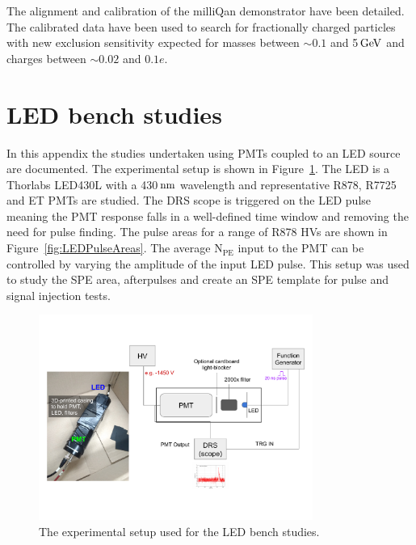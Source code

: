 \documentclass[12pt]{article}
\newcommand{\unit}[1]{\ensuremath{\text{\,#1}}\xspace}
\newcommand{\npe} {\mbox{\ensuremath{\textrm{N}_\textrm{PE}}}\xspace}
\begin{document}
The alignment and calibration of the milliQan demonstrator have been detailed. The calibrated
data have been used to search for fractionally charged particles with new 
exclusion sensitivity expected for masses between $\sim0.1$ and 5\unit{GeV} 
and charges between $\sim0.02$ and $0.1e$.

\appendix
\section{LED bench studies}
\label{app:speLEDCalib}
In this appendix the studies undertaken using PMTs coupled to an LED source are documented.
The experimental setup is shown in Figure~\ref{fig:LEDSetup}. The LED is a Thorlabs LED430L with a 430\unit{nm} wavelength 
and representative R878, R7725 and ET PMTs are studied. The DRS scope is triggered on
the LED pulse meaning the PMT response falls in a well-defined time window 
and removing the need for pulse finding. The pulse areas for a range of R878 HVs are
shown in Figure~\ref{fig:LEDPulseAreas}. The average \npe input to the PMT can be controlled by varying the amplitude of the input LED pulse.
This setup was used to study the SPE area, afterpulses and create an SPE template for 
pulse and signal injection tests. 

\begin{figure}[ht!]
    \centering
    \includegraphics[width=0.8\textwidth]{figures/LEDsetup}
    \caption{\label{fig:LEDSetup} The experimental setup used for the LED bench studies. }
\end{figure}
\end{document}
